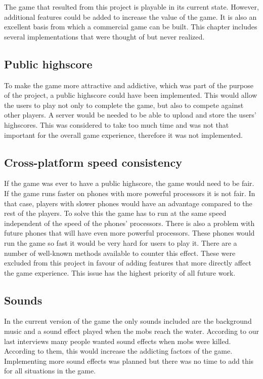 The game that resulted from this project is playable in its current state. However, additional features could be added to increase the value of the game. It is also an excellent basis from which a commercial game can be built. This chapter includes several implementations that were thought of but never realized.

\subsection{Public highscore}

To make the game more attractive and addictive, which was part of the purpose of the project, a public highscore could have been implemented. This would allow the users to play not only to complete the game, but also to compete against other players. A server would be needed to be able to upload and store the users' highscores. This was considered to take too much time and was not that important for the overall game experience, therefore it was not implemented.
\subsection{Cross-platform speed consistency}

If the game was ever to have a public highscore, the game would need to be fair. If the game runs faster on phones with more powerful processors it is not fair. In that case, players with slower phones would have an advantage compared to the rest of the players. To solve this the game has to run at the same speed independent of the speed of the phones' processors. There is also a problem with future phones that will have even more powerful processors. These phones would run the game so fast it would be very hard for users to play it. There are a number of well-known methods available to counter this effect. These were excluded from this project in favour of adding features that more directly affect the game experience. This issue has the highest priority of all future work.
\subsection{Sounds}

In the current version of the game the only sounds included are the background music and a sound effect played when the mobs reach the water. According to our last interviews many people wanted sound effects when mobs were killed. According to them, this would increase the addicting factors of the game. Implementing more sound effects was planned but there was no time to add this for all situations in the game.
